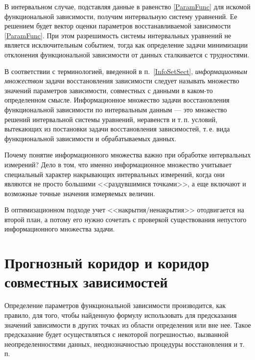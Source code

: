 \documentclass[a5paper,openany]{book}
\begin{document}
В интервальном случае, подставляя данные в равенство \eqref{ParamFunc} для искомой функциональной зависимости, получим интервальную систему уравнений. Ее решением будет вектор оценки параметров восстанавливаемой зависимости 
\eqref{ParamFunc}. При этом разрешимость системы интервальных уравнений 
не является исключительным событием, тогда как определение задачи минимизации отклонения функциональной зависимости от данных сталкивается с трудностями. 

В соответствии с терминологией, введенной в п.~\ref{InfoSetSect}, \emph{информационным множеством} задачи восстановления зависимости 
следует называть множество значений параметров зависимости, совместных с данными в каком-то 
определенном смысле. Информационное множество задачи восстановления функциональной зависимости по интервальным 
данным --- это множество решений интервальной системы уравнений, неравенств и т.\,п. 
условий, вытекающих из постановки задачи восстановления зависимостей, т.\,е. вида 
функциональной зависимости и обрабатываемых данных. 

Почему понятие информационного множества важно при обработке интервальных 
измерений?  Дело в том, что именно информационное множество учитывает специальный 
характер накрывающих интервальных измерений, когда они являются не просто большими 
<<раздувшимися точками>>, а еще включают и возможные точные значения измеряемых 
величин. 

В оптимизационном подходе учет <<накрытия/ненакрытия>> отодвигается на второй план, а потому его нужно сочетать с проверкой существования непустого информационного множества задачи. 


\section[Прогнозный коридор и коридор совместных зависимостей]{Прогнозный коридор и коридор \\ совместных зависимостей} 
\label{CmptFunCorSect} 


Определение параметров функциональной зависимости производится, как правило, для того, 
чтобы найденную формулу использовать для предсказания значений зависимости 
в других точках из области определения или вне нее. Такое предсказание 
будет осуществляться с некоторой погрешностью, вызванной неопределенностями данных, 
неоднозначностью процедуры восстановления и т.\,п. 
\end{document}
